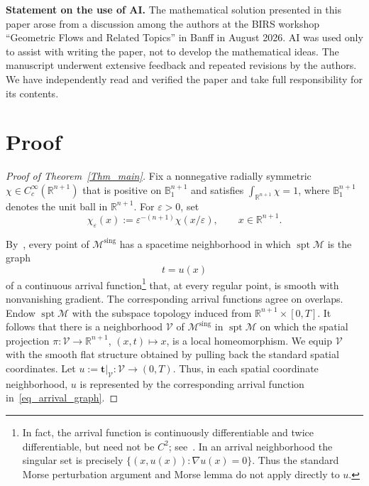 \documentclass[10pt,a4paper]{amsart}
\newcommand{\IR}{\mathbb{R}}
\newcommand{\IB}{\mathbb{B}}
\newcommand{\VV}{\mathcal{V}}
\newcommand{\MM}{\mathcal{M}}
\newcommand{\eps}{\varepsilon}
\DeclareMathOperator{\sing}{sing}
\DeclareMathOperator{\spt}{spt}
\numberwithin{equation}{section}
\begin{document}
\medskip

\noindent\textbf{Statement on the use of AI.}
The mathematical solution presented in this paper arose from a discussion among the authors at the BIRS workshop ``Geometric Flows and Related Topics'' in Banff in August 2026.
AI was used only to assist with writing the paper, not to develop the mathematical ideas.
The manuscript underwent extensive feedback and repeated revisions by the authors.
We have independently read and verified the paper and take full responsibility for its contents.

\section{Proof}


\begin{proof}[Proof of Theorem~\ref{Thm_main}]
Fix a nonnegative radially symmetric $\chi\in C_c^\infty(\IR^{n+1})$ that is positive on $\IB^{n+1}_1$ and satisfies $\int_{\IR^{n+1}}\chi=1$, where $\IB^{n+1}_1$ denotes the unit ball in $\IR^{n+1}$.  For $\eps>0$, set
\[
 \chi_\eps(x):=\eps^{-(n+1)}\chi(x/\eps),\qquad x\in\IR^{n+1}.
\]

By~\cite[Theorem~1.11]{BamlerLai}, every point of $\MM^{\sing}$ has a spacetime neighborhood in which $\spt\MM$ is the graph
\[
 t=u(x)
\tag{3.1}\label{eq_arrival_graph}
\]
of a continuous arrival function\footnote{In fact, the arrival function is continuously differentiable and twice differentiable, but need not be $C^2$; see~\cite{ColdingMinicozziDifferentiability,ColdingMinicozziRegularity}. In an arrival neighborhood the singular set is precisely $\{(x,u(x)):\nabla u(x)=0\}$. Thus the standard Morse perturbation argument and Morse lemma do not apply directly to $u$.} that, at every regular point, is smooth with nonvanishing gradient.
The corresponding arrival functions agree on overlaps.
Endow $\spt\MM$ with the subspace topology induced from $\IR^{n+1}\times[0,T]$.
It follows that there is a neighborhood $\VV$ of $\MM^{\sing}$ in $\spt\MM$ on which the spatial projection
$\pi:\VV\to\IR^{n+1}$, $(x,t)\mapsto x$, is a local homeomorphism.
We equip $\VV$ with the smooth flat structure obtained by pulling back the standard spatial coordinates.
Let $u:=\mathbf{t}|_\VV:\VV\to(0,T)$.
Thus, in each spatial coordinate neighborhood, $u$ is represented by the corresponding arrival function in~\eqref{eq_arrival_graph}.


\end{proof}
\end{document}
